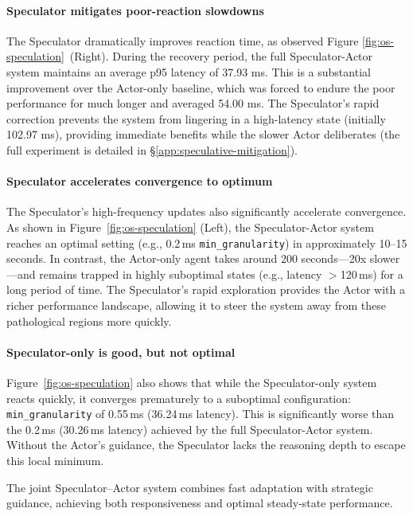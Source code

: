 \paragraph{Speculator mitigates poor-reaction slowdowns} The Speculator dramatically improves reaction time, as observed Figure \ref{fig:os-speculation}~(Right). During the recovery period, the full Speculator-Actor system maintains an average p95 latency of 37.93 ms. This is a substantial improvement over the Actor-only baseline, which was forced to endure the poor performance for much longer and averaged 54.00 ms. The Speculator's rapid correction prevents the system from lingering in a high-latency state (initially 102.97 ms), providing immediate benefits while the slower Actor deliberates (the full experiment is detailed in \S\ref{app:speculative-mitigation}).

\paragraph{Speculator accelerates convergence to optimum}
The Speculator's high-frequency updates also significantly accelerate convergence. 
As shown in Figure~\ref{fig:os-speculation} (Left), the Speculator-Actor system reaches an optimal setting (e.g., 0.2\,ms \texttt{min\_granularity}) in approximately 10–15 seconds. 
In contrast, the Actor-only agent takes around 200 seconds---20x slower---and remains trapped in highly suboptimal states (e.g., latency $>$120\,ms) for a long period of time. 
The Speculator's rapid exploration provides the Actor with a richer performance landscape, allowing it to steer the system away from these pathological regions more quickly.


\paragraph{Speculator-only is good, but not optimal}
Figure~\ref{fig:os-speculation} also shows that while the Speculator-only system reacts quickly, it converges prematurely to a suboptimal configuration: \texttt{min\_granularity} of 0.55\,ms (36.24\,ms latency). 
This is significantly worse than the 0.2\,ms (30.26\,ms latency) achieved by the full Speculator-Actor system. Without the Actor's guidance, the Speculator lacks the reasoning depth to escape this local minimum.

The joint Speculator–Actor system combines fast adaptation with strategic guidance, achieving both responsiveness and optimal steady-state performance.
